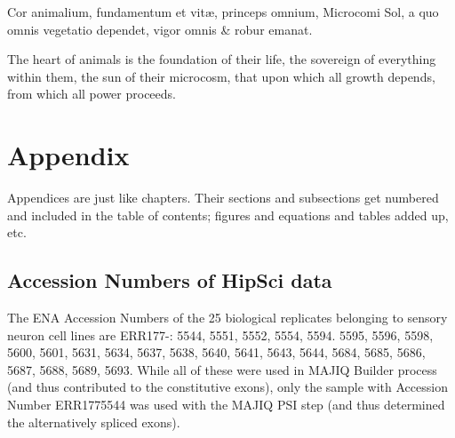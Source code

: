 \begin{savequote}[8cm]
\textlatin{Cor animalium, fundamentum e\longs t vitæ, princeps omnium, Microco\longs mi Sol, a quo omnis vegetatio dependet, vigor omnis \& robur emanat.}

The heart of animals is the foundation of their life, the sovereign of everything within them, the sun of their microcosm, that upon which all growth depends, from which all power proceeds.
\end{savequote}

\chapter{\label{app:appendix}Appendix}

\minitoc

Appendices are just like chapters.  Their sections and subsections get numbered and included in the table of contents; figures and equations and tables added up, etc.  


\section{Accession Numbers of HipSci data} \label{app:hipsci_celllines}
The ENA Accession Numbers of the 25 biological replicates belonging to sensory neuron cell lines \cite{ipscneurons} are ERR177-: 
5544, 5551, 5552, 5554, 5594. 5595, 5596, 5598, 5600, 5601, 5631, 5634, 5637, 5638, 5640, 5641, 5643, 5644, 5684, 5685, 5686, 5687, 5688, 5689, 5693.
While all of these were used in MAJIQ Builder process (and thus contributed to the constitutive exons), only the sample with Accession Number ERR1775544 was used with the MAJIQ PSI step (and thus determined the alternatively spliced exons). 

